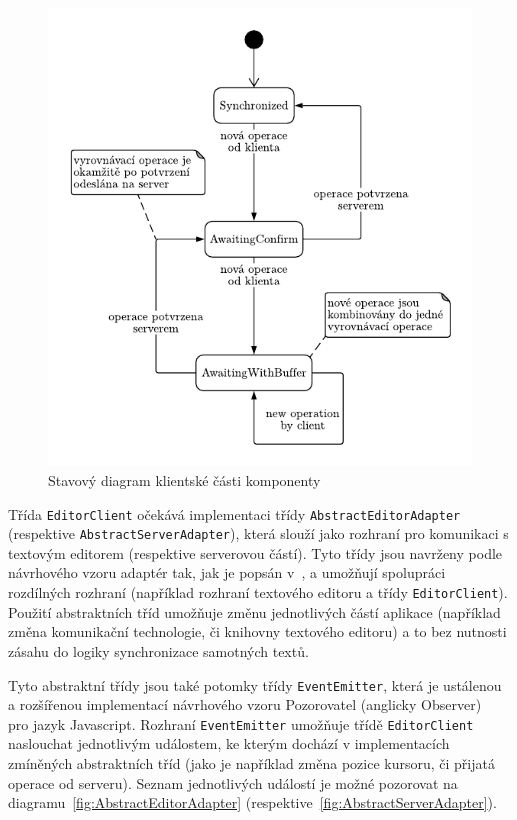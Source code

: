 \begin{figure}[ht!]
    \centering
    \includegraphics[width=\textwidth]{partials/navrh/editor/stavovyDiagram.pdf}
    \caption{Stavový diagram klientské části komponenty}\label{fig:stavovyDiagram}
\end{figure}

Třída \texttt{EditorClient} očekává implementaci třídy \texttt{AbstractEditorAdapter} (respektive \texttt{AbstractServerAdapter}), která slouží jako rozhraní pro komunikaci s textovým editorem (respektive serverovou částí).
Tyto třídy jsou navrženy podle návrhového vzoru adaptér tak, jak je popsán v~\cite[str.~135]{gof:patterns}, a umožňují spolupráci rozdílných rozhraní (například rozhraní textového editoru a třídy \texttt{EditorClient}).
Použití abstraktních tříd umožňuje změnu jednotlivých částí aplikace (například změna komunikační technologie, či knihovny textového editoru) a to bez nutnosti zásahu do logiky synchronizace samotných textů.

Tyto abstraktní třídy jsou také potomky třídy \texttt{EventEmitter}, která je ustálenou a rozšířenou implementací návrhového vzoru Pozorovatel (anglicky Observer)~\cite[str.~273]{gof:patterns} pro jazyk Javascript.
Rozhraní \texttt{EventEmitter} umožňuje třídě \texttt{EditorClient} naslouchat jednotlivým událostem, ke kterým dochází v implementacích zmíněných abstraktních tříd (jako je například změna pozice kursoru, či přijatá operace od serveru).
Seznam jednotlivých událostí je možné pozorovat na diagramu~\ref{fig:AbstractEditorAdapter} (respektive~\ref{fig:AbstractServerAdapter}).


